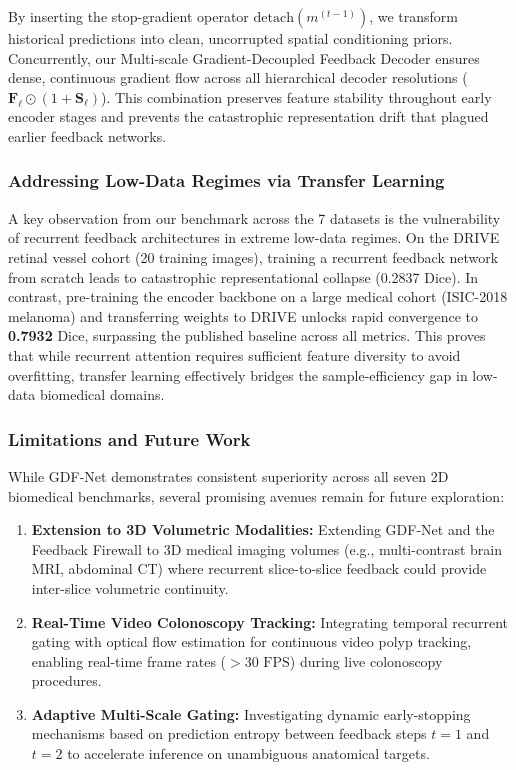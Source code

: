 By inserting the stop-gradient operator $\text{detach}(m^{(t-1)})$, we transform historical predictions into clean, uncorrupted spatial conditioning priors. Concurrently, our Multi-scale Gradient-Decoupled Feedback Decoder ensures dense, continuous gradient flow across all hierarchical decoder resolutions ($\mathbf{F}_\ell \odot (1 + \mathbf{S}_\ell)$). This combination preserves feature stability throughout early encoder stages and prevents the catastrophic representation drift that plagued earlier feedback networks.

\subsubsection{Addressing Low-Data Regimes via Transfer Learning}
A key observation from our benchmark across the 7 datasets is the vulnerability of recurrent feedback architectures in extreme low-data regimes. On the DRIVE retinal vessel cohort (20 training images), training a recurrent feedback network from scratch leads to catastrophic representational collapse (0.2837 Dice). In contrast, pre-training the encoder backbone on a large medical cohort (ISIC-2018 melanoma) and transferring weights to DRIVE unlocks rapid convergence to \textbf{0.7932} Dice, surpassing the published baseline across all metrics. This proves that while recurrent attention requires sufficient feature diversity to avoid overfitting, transfer learning effectively bridges the sample-efficiency gap in low-data biomedical domains.

\subsubsection{Limitations and Future Work}
While GDF-Net demonstrates consistent superiority across all seven 2D biomedical benchmarks, several promising avenues remain for future exploration:
\begin{enumerate}
  \item \textbf{Extension to 3D Volumetric Modalities:} Extending GDF-Net and the Feedback Firewall to 3D medical imaging volumes (e.g., multi-contrast brain MRI, abdominal CT) where recurrent slice-to-slice feedback could provide inter-slice volumetric continuity.
  \item \textbf{Real-Time Video Colonoscopy Tracking:} Integrating temporal recurrent gating with optical flow estimation for continuous video polyp tracking, enabling real-time frame rates ($>30\text{ FPS}$) during live colonoscopy procedures.
  \item \textbf{Adaptive Multi-Scale Gating:} Investigating dynamic early-stopping mechanisms based on prediction entropy between feedback steps $t=1$ and $t=2$ to accelerate inference on unambiguous anatomical targets.
\end{enumerate}

